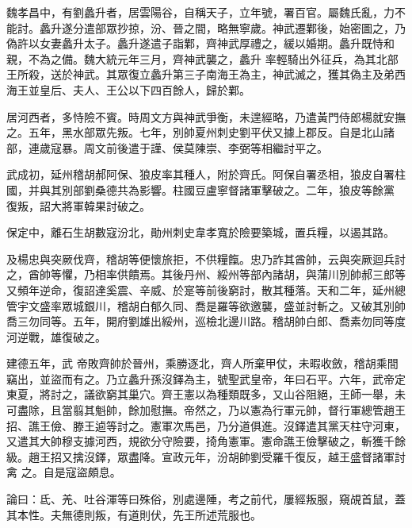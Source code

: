 \begin{pinyinscope}
 魏孝昌中，有劉蠡升者，居雲陽谷，自稱天子，立年號，署百官。屬魏氏亂，力不能討。蠡升遂分遣部眾抄掠，汾、晉之間，略無寧歲。神武遷鄴後，始密圖之，乃偽許以女妻蠡升太子。蠡升遂遣子詣鄴，齊神武厚禮之，緩以婚期。蠡升既恃和親，不為之備。魏大統元年三月，齊神武襲之，蠡升
 率輕騎出外征兵，為其北部王所殺，送於神武。其眾復立蠡升第三子南海王為主，神武滅之，獲其偽主及弟西海王並皇后、夫人、王公以下四百餘人，歸於鄴。



 居河西者，多恃險不賓。時周文方與神武爭衡，未遑經略，乃遣黃門侍郎楊就安撫之。五年，黑水部眾先叛。七年，別帥夏州刺史劉平伏又據上郡反。自是北山諸部，連歲寇暴。周文前後遣于謹、侯莫陳崇、李弼等相繼討平之。



 武成初，延州稽胡郝阿保、狼皮率其種人，附於齊氏。阿保自署丞相，狼皮自署柱國，并與其別部劉桑德共為影響。柱國豆盧寧督諸軍擊破之。二年，狼皮等餘黨
 復叛，詔大將軍韓果討破之。



 保定中，離石生胡數寇汾北，勛州刺史韋孝寬於險要築城，置兵糧，以遏其路。



 及楊忠與突厥伐齊，稽胡等便懷旅拒，不供糧餼。忠乃詐其酋帥，云與突厥迴兵討之，酋帥等懼，乃相率供饋焉。其後丹州、綏州等部內諸胡，與蒲川別帥郝三郎等又頻年逆命，復詔達奚震、辛威、於寔等前後窮討，散其種落。天和二年，延州總管宇文盛率眾城銀川，稽胡白郁久同、喬是羅等欲邀襲，盛並討斬之。又破其別帥喬三勿同等。五年，開府劉雄出綏州，巡檢北邊川路。稽胡帥白郎、喬素勿同等度河逆戰，雄復破之。



 建德五年，武
 帝敗齊帥於晉州，乘勝逐北，齊人所棄甲仗，未暇收斂，稽胡乘間竊出，並盜而有之。乃立蠡升孫沒鐸為主，號聖武皇帝，年曰石平。六年，武帝定東夏，將討之，議欲窮其巢穴。齊王憲以為種類既多，又山谷阻絕，王師一舉，未可盡除，且當翦其魁帥，餘加慰撫。帝然之，乃以憲為行軍元帥，督行軍總管趙王招、譙王儉、滕王逌等討之。憲軍次馬邑，乃分道俱進。沒鐸遣其黨天柱守河東，又遣其大帥穆支據河西，規欲分守險要，掎角憲軍。憲命譙王儉擊破之，斬獲千餘級。趙王招又擒沒鐸，眾盡降。宣政元年，汾胡帥劉受羅千復反，越王盛督諸軍討禽
 之。自是寇盜頗息。



 論曰：氐、羌、吐谷渾等曰殊俗，別處邊陲，考之前代，屢經叛服，窺覘首鼠，蓋其本性。夫無德則叛，有道則伏，先王所述荒服也。



\end{pinyinscope}